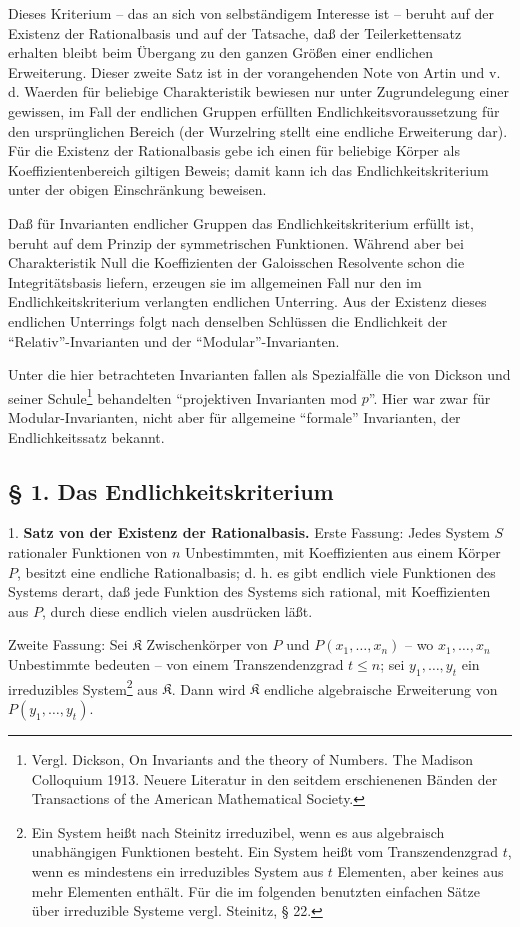 \documentclass[11pt]{article}
\begin{document}
Dieses Kriterium -- das an sich von selbständigem Interesse ist -- beruht auf der Existenz der Rationalbasis und auf der Tatsache, daß der Teilerkettensatz erhalten bleibt beim Übergang zu den ganzen Größen einer endlichen Erweiterung. Dieser zweite Satz ist in der vorangehenden Note von Artin und v. d. Waerden für beliebige Charakteristik bewiesen nur unter Zugrundelegung einer gewissen, im Fall der endlichen Gruppen erfüllten Endlichkeitsvoraussetzung für den ursprünglichen Bereich (der Wurzelring stellt eine endliche Erweiterung dar). Für die Existenz der Rationalbasis gebe ich einen für beliebige Körper als Koeffizientenbereich giltigen Beweis; damit kann ich das Endlichkeitskriterium unter der obigen Einschränkung beweisen.

Daß für Invarianten endlicher Gruppen das Endlichkeitskriterium erfüllt ist, beruht auf dem Prinzip der symmetrischen Funktionen. Während aber bei Charakteristik Null die Koeffizienten der Galoisschen Resolvente schon die Integritätsbasis liefern, erzeugen sie im allgemeinen Fall nur den im Endlichkeitskriterium verlangten endlichen Unterring. Aus der Existenz dieses endlichen Unterrings folgt nach denselben Schlüssen die Endlichkeit der ``Relativ''-Invarianten und der ``Modular''-Invarianten.

Unter die hier betrachteten Invarianten fallen als Spezialfälle die von Dickson und seiner Schule\footnote{Vergl. Dickson, On Invariants and the theory of Numbers. The Madison Colloquium 1913. Neuere Literatur in den seitdem erschienenen Bänden der Transactions of the American Mathematical Society.} behandelten ``projektiven Invarianten mod $p$''. Hier war zwar für Modular-Invarianten, nicht aber für allgemeine ``formale'' Invarianten, der Endlichkeitssatz bekannt.

\subsection*{§ 1. Das Endlichkeitskriterium}

1. \textbf{Satz von der Existenz der Rationalbasis.} Erste Fassung: Jedes System $S$ rationaler Funktionen von $n$ Unbestimmten, mit Koeffizienten aus einem Körper $P$, besitzt eine endliche Rationalbasis; d. h. es gibt endlich viele Funktionen des Systems derart, daß jede Funktion des Systems sich rational, mit Koeffizienten aus $P$, durch diese endlich vielen ausdrücken läßt.

Zweite Fassung: Sei $\mathfrak K$ Zwischenkörper von $P$ und $P(x_1,\ldots,x_n)$ -- wo $x_1,\ldots,x_n$ Unbestimmte bedeuten -- von einem Transzendenzgrad $t\leq n$; sei $y_1,\ldots,y_t$ ein irreduzibles System\footnote{Ein System heißt nach Steinitz irreduzibel, wenn es aus algebraisch unabhängigen Funktionen besteht. Ein System heißt vom Transzendenzgrad $t$, wenn es mindestens ein irreduzibles System aus $t$ Elementen, aber keines aus mehr Elementen enthält. Für die im folgenden benutzten einfachen Sätze über irreduzible Systeme vergl. Steinitz, § 22.} aus $\mathfrak K$. Dann wird $\mathfrak K$ endliche algebraische Erweiterung von $P(y_1,\ldots,y_t)$.
\end{document}
